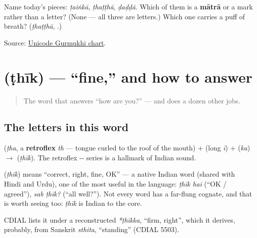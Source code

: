 \begin{tcolorbox}[breakable,colback=teal!4,colframe=teal!35!black,title={Before you move on}]
Name today's pieces: \emph{ṭaiṅkā}, \emph{ṭhaṭṭhā}, \emph{ḍaḍḍā}. Which of them is a \textbf{mātrā} or a mark rather than a letter? (None — all three are letters.) Which one carries a puff of breath? (\emph{ṭhaṭṭhā}, \textbf{}.)

Source: \href{https://www.unicode.org/charts/PDF/U0A00.pdf}{Unicode Gurmukhi chart}.
\end{tcolorbox}
\section[\texorpdfstring{\pa{ਠੀਕ} (ṭhīk)}{ਠੀਕ (ṭhīk)}]{ (ṭhīk) — \textquotedblleft{}fine,\textquotedblright{} and how to answer}

\label{lesson:PA-C03-thik}



\begin{quote}
The word that answers \textquotedblleft{}how are you?\textquotedblright{} — and does a dozen other jobs.
\end{quote}

\subsection*{The letters in this word}
\textbf{} (\emph{ṭha}, a \textbf{retroflex} \emph{th} — tongue curled to the roof of the mouth) + \textbf{} (long \emph{ī}) + \textbf{} (\emph{ka}) $\to$ \textbf{} (\emph{ṭhīk}). The retroflex -- series is a hallmark of Indian sound.

\begin{cousinweb}
\textbf{} (\emph{ṭhīk}) means \textquotedblleft{}correct, right, fine, OK\textquotedblright{} — a native Indian word (shared with Hindi and Urdu), one of the most useful in the language: \emph{ṭhīk hai} (\textquotedblleft{}OK / agreed\textquotedblright{}), \emph{sab ṭhīk?} (\textquotedblleft{}all well?\textquotedblright{}). Not every word has a far-flung cognate, and that is worth seeing too: \emph{ṭhīk} is Indian to the core.

CDIAL lists it under a reconstructed \emph{*ṭhīkka}, \textquotedblleft{}firm, right\textquotedblright{}, which it derives, probably, from Sanskrit \emph{sthita}, \textquotedblleft{}standing\textquotedblright{} (CDIAL 5503).
\end{cousinweb}

